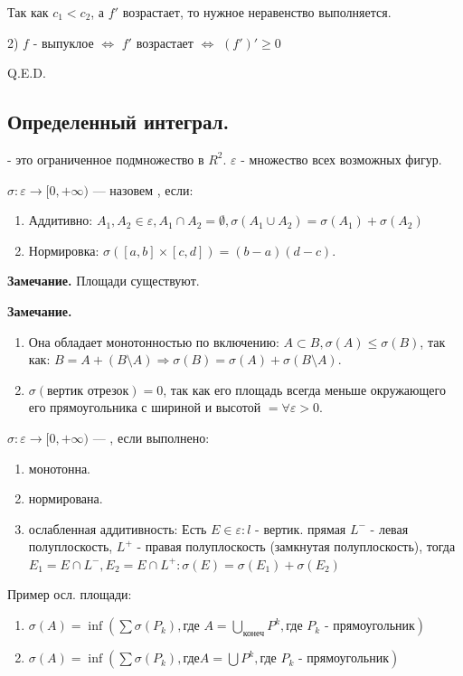 Так как $c_1 < c_2$, а $f'$ возрастает, то нужное неравенство выполняется.

2) $f$ - выпуклое $\Leftrightarrow$ $f'$ возрастает $\Leftrightarrow$ $(f')'\geq 0 $

\hfill Q.E.D.
\pagebreak


\subsection{Определенный интеграл.}


  - это ограниченное подмножество в $R^2$. $\varepsilon$ - множество всех возможных фигур.

$\sigma: \varepsilon \rightarrow [0,+\infty)$ ---  назовем , если:
\begin{enumerate}
    \item Аддитивно: $A_1,A_2 \in \varepsilon, A_1\cap A_2 = \emptyset, \sigma(A_1\cup A_2) = \sigma(A_1)+\sigma(A_2)$
\item Нормировка: $\sigma ([a,b]\times[c,d]) = (b-a)(d-c)$.
\end{enumerate}

\textbf{Замечание.} Площади существуют.

\textbf{Замечание.} \begin{enumerate}
    \item Она обладает монотонностью по включению: $A \subset B, \sigma(A) \leq \sigma(B)$, так как: $B = A + (B \setminus A) \Rightarrow \sigma(B) = \sigma(A) + \sigma(B \setminus A)$.
    \item $\sigma(\text{вертик отрезок})=0$, так как его площадь всегда меньше окружающего его прямоугольника с шириной и высотой $= \forall \varepsilon > 0$.
\end{enumerate}

  $\sigma:\varepsilon\rightarrow [0,+\infty)$ --- , если выполнено:
\begin{enumerate}
    \item монотонна.
    \item нормирована.
    \item ослабленная аддитивность: Есть $E \in \varepsilon: l $ - вертик. прямая $L^-$ - левая полуплоскость, $L^{+}$ - правая полуплоскость (замкнутая полуплоскость), тогда  $E_1 = E\cap L^-, E_2 = E \cap L^+: \sigma(E)=\sigma(E_1)+\sigma(E_2)$
\end{enumerate}

Пример осл. площади:
\begin{enumerate}
    \item $\sigma(A) = \inf (\sum \sigma(P_k), \text{где $A = \bigcup\limits_{\text{конеч}}P^k, \text{где $P_k$ - прямоугольник}$})$ 
    \item $\sigma(A) = \inf (\sum \sigma(P_k), \text{где} A = \bigcup P^k, \text{где $P_k$ - прямоугольник})$
\end{enumerate}

